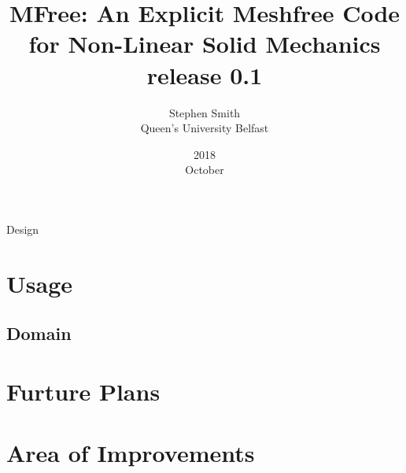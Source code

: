 \documentclass[openany,oneside,12pt]{book}
\title{MFree: An Explicit Meshfree Code for Non-Linear Solid Mechanics \\ release 0.1}
\date{2018 \\ October}
\author{Stephen Smith \\ Queen's University Belfast}
\begin{document}
\frontmatter
\maketitle
\tableofcontents
\mainmatter


 {Design}
\chapter{Usage}
\section{Domain}	
\chapter{Furture Plans}
\chapter{Area of Improvements}	
\end{document}

